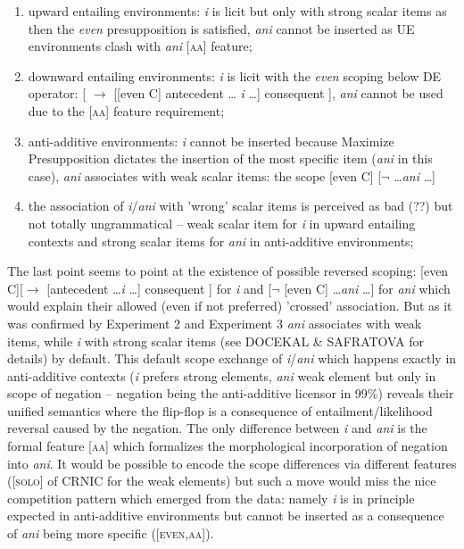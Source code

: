 \documentclass[12pt]{scrartcl}
\begin{document}
\begin{enumerate}
	\item upward entailing environments: \textit{i} is licit but only with strong scalar items as then the \textit{even} presupposition is satisfied, \textit{ani} cannot be inserted as UE environments clash with \textit{ani} [\textsc{aa}] feature;
	\item downward entailing environments: \textit{i} is licit with the \textit{even} scoping below DE operator:  {[} \(\rightarrow\) {[}{[}even C{]} antecedent \ldots{} \textit{i} \ldots ] consequent ], \textit{ani} cannot be used due to the [\textsc{aa}] feature requirement;
	\item anti-additive environments: \textit{i} cannot be inserted because Maximize Presupposition dictates the insertion of the most specific item (\textit{ani} in this case), \textit{ani} associates with weak scalar items: the scope [even C] [$\neg$ \ldots \textit{ani} \ldots]
	\item the association of \textit{i}/\textit{ani} with 'wrong' scalar items is perceived as bad (??) but not totally ungrammatical -- weak scalar item for \textit{i} in upward entailing contexts and strong scalar items for \textit{ani} in anti-additive environments;
	
\end{enumerate}

The last point seems to point at the existence of possible reversed scoping: [even C][$\rightarrow$ [antecedent \ldots \textit{i} \ldots] consequent ] for \textit{i} and  [$\neg$ [even C] \ldots \textit{ani} \ldots] for \textit{ani} which would explain their allowed (even if not preferred) 'crossed' association. But as it was confirmed by Experiment 2 and Experiment 3 \textit{ani} associates with weak items, while \textit{i} with strong scalar items (see DOCEKAL \& SAFRATOVA for details) by default. This default scope exchange of \textit{i}/\textit{ani} which happens exactly in anti-additive contexts (\textit{i} prefers strong elements, \textit{ani} weak element but only in scope of negation -- negation being the anti-additive licensor in 99\%) reveals their unified semantics where the flip-flop is a consequence of entailment/likelihood reversal caused by the negation. The only difference between \textit{i} and \textit{ani} is the formal feature [\textsc{aa}] which formalizes the morphological incorporation of negation into \textit{ani}.  It would be possible to encode the scope differences via different features ([\textsc{solo}] of CRNIC for the weak elements) but such a move would miss the nice competition pattern which emerged from the data: namely \textit{i} is in principle expected in anti-additive environments but cannot be inserted as a consequence of \textit{ani} being more specific ([\textsc{even,aa}]).
\end{document}
